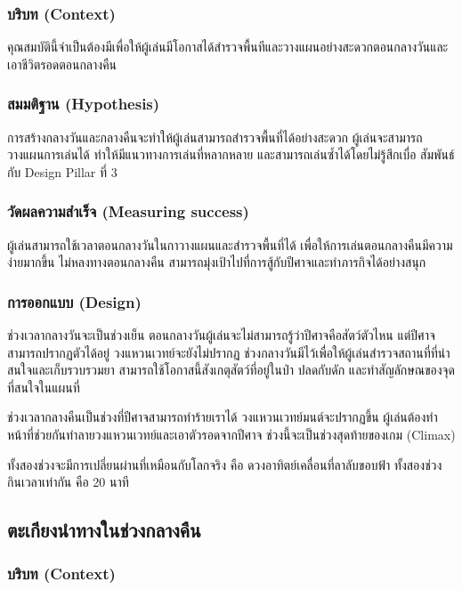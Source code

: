 \subsubsection{บริบท (Context)}

คุณสมบัตินี้จำเป็นต้องมีเพื่อให้ผู้เล่นมีโอกาสได้สำรวจพื้นทีและวางแผนอย่างสะดวกตอนกลางวันและเอาชีวิตรอดตอนกลางคืน

\subsubsection{สมมติฐาน (Hypothesis)}

การสร้างกลางวันและกลางคืนจะทำให้ผู้เล่นสามารถสำรวจพื้นที่ได้อย่างสะดวก ผู้เล่นจะสามารถวางแผนการเล่นได้ ทำให้มีแนวทางการเล่นที่หลากหลาย และสามารถเล่นซ้ำได้โดยไม่รู้สึกเบื่อ สัมพันธ์กับ Design Pillar ที่ 3

\subsubsection{วัดผลความสำเร็จ (Measuring success)}

ผู้เล่นสามารถใช้เวลาตอนกลางวันในกาวางแผนและสำรวจพื้นที่ได้ เพื่อให้การเล่นตอนกลางคืนมีความง่ายมากขึ้น ไม่หลงทางตอนกลางคืน สามารถมุ่งเป้าไปที่การสู้กับปีศาจและทำภารกิจได้อย่างสนุก

\subsubsection{การออกแบบ (Design)}

ช่วงเวลากลางวันจะเป็นช่วงเย็น ตอนกลางวันผู้เล่นจะไม่สามารถรู้ว่าปีศาจคือสัตว์ตัวไหน แต่ปีศาจสามารถปรากฏตัวได้อยู่ วงแหวนเวทย์จะยังไม่ปรากฏ ช่วงกลางวันมีไว้เพื่อให้ผู้เล่นสำรวจสถานที่ที่น่าสนใจและเก็บรวบรวมยา สามารถใช้โอกาสนี้สังเกตุสัตว์ที่อยู่ในป่า ปลดกับดัก และทำสัญลักษณของจุดที่สนใจในแผนที่

ช่วงเวลากลางคืนเป็นช่วงที่ปีศาจสามารถทำร้ายเราได้ วงแหวนเวทย์มนต์จะปรากฏขึ้น ผู้เล่นต้องทำหน้าที่ช่วยกันทำลายวงแหวนเวทย์และเอาตัวรอดจากปีศาจ ช่วงนี้จะเป็นช่วงสุดท้ายของเกม (Climax)

ทั้งสองช่วงจะมีการเปลี่ยนผ่านที่เหมือนกับโลกจริง คือ ดวงอาทิตย์เคลื่อนที่ลาลับขอบฟ้า ทั้งสองช่วงกินเวลาเท่ากัน คือ 20 นาที

\subsection{ตะเกียงนำทางในช่วงกลางคืน}
\subsubsection{บริบท (Context)}

